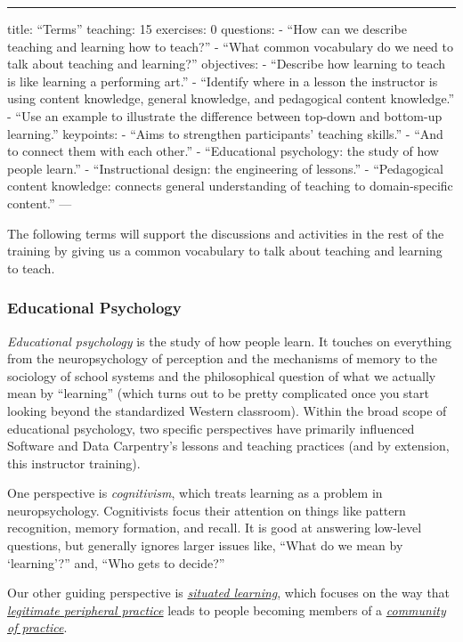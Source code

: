 \begin{center}
\rule{3in}{0.4pt}
\end{center}
title: ``Terms''
teaching: 15
exercises: 0
questions:
- ``How can we describe teaching and learning how to teach?''
- ``What common vocabulary do we need to talk about teaching and learning?''
objectives:
- ``Describe how learning to teach is like learning a performing art.''
- ``Identify where in a lesson the instructor is using content knowledge, general knowledge, and pedagogical content knowledge.''
- ``Use an example to illustrate the difference between top-down and bottom-up learning.''
keypoints:
- ``Aims to strengthen participants' teaching skills.''
- ``And to connect them with each other.''
- ``Educational psychology: the study of how people learn.''
- ``Instructional design: the engineering of lessons.''
- ``Pedagogical content knowledge: connects general understanding of teaching to domain-specific content.''
---

The following terms will support the discussions and activities in the rest of the training
by giving us a common vocabulary to talk about teaching and learning to teach.

\subsubsection*{Educational Psychology}

\emph{Educational psychology} is the study of how people learn.
It touches on everything from the neuropsychology of perception and the mechanisms of memory
to the sociology of school systems
and the philosophical question of what we actually mean by ``learning''
(which turns out to be pretty complicated once you start looking beyond the standardized Western classroom).
Within the broad scope of educational psychology,
two specific perspectives have primarily influenced Software and Data Carpentry's lessons and teaching practices
(and by extension, this instructor training).

One perspective is \emph{cognitivism},
which treats learning as a problem in neuropsychology.
Cognitivists focus their attention on things like pattern recognition,
memory formation, and recall. It is good at answering low-level questions,
but generally ignores larger issues like, ``What do we mean by `learning'?''
and, ``Who gets to decide?''

Our other guiding perspective is
\emph{\href{https://en.wikipedia.org/wiki/Situated\_learning}{situated learning}},
which focuses on the way that
\emph{\href{https://en.wikipedia.org/wiki/Legitimate\_peripheral\_participation}{legitimate peripheral practice}}
leads to people becoming members of
a \emph{\href{https://en.wikipedia.org/wiki/Community\_of\_practice}{community of practice}}.

